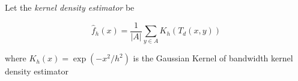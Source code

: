 Let the \textit{ kernel density estimator} be

\[   \hat{f}_h(x) = \frac{1}{|A|}\sum_{ y \in A} K_h (T_d(x,y))  \]

 where $K_h(x) = \exp( -x^2/h^2)$ is the Gaussian Kernel of bandwidth 
 kernel density estimator

